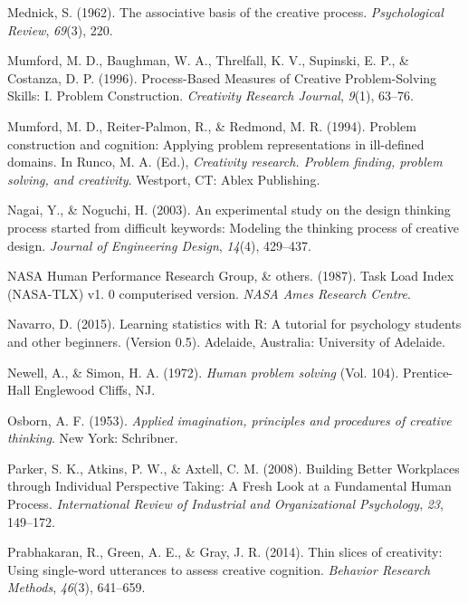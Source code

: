 \documentclass[english,man]{apa6}
\begin{document}
\leavevmode\hypertarget{ref-mednick1962associative}{}%
Mednick, S. (1962). The associative basis of the creative process.
\emph{Psychological Review}, \emph{69}(3), 220.

\leavevmode\hypertarget{ref-mumford_process-based_1996}{}%
Mumford, M. D., Baughman, W. A., Threlfall, K. V., Supinski, E. P., \&
Costanza, D. P. (1996). Process-Based Measures of Creative
Problem-Solving Skills: I. Problem Construction. \emph{Creativity
Research Journal}, \emph{9}(1), 63--76.

\leavevmode\hypertarget{ref-mumford_problem_1994}{}%
Mumford, M. D., Reiter-Palmon, R., \& Redmond, M. R. (1994). Problem
construction and cognition: Applying problem representations in
ill-defined domains. In Runco, M. A. (Ed.), \emph{Creativity research.
Problem finding, problem solving, and creativity}. Westport, CT: Ablex
Publishing.

\leavevmode\hypertarget{ref-nagai2003experimental}{}%
Nagai, Y., \& Noguchi, H. (2003). An experimental study on the design
thinking process started from difficult keywords: Modeling the thinking
process of creative design. \emph{Journal of Engineering Design},
\emph{14}(4), 429--437.

\leavevmode\hypertarget{ref-nasa1987task}{}%
NASA Human Performance Research Group, \& others. (1987). Task Load
Index (NASA-TLX) v1. 0 computerised version. \emph{NASA Ames Research
Centre}.

\leavevmode\hypertarget{ref-NavarroLearningstatisticstutorial2015}{}%
Navarro, D. (2015). Learning statistics with R: A tutorial for
psychology students and other beginners. (Version 0.5). Adelaide,
Australia: University of Adelaide.

\leavevmode\hypertarget{ref-newell1972human}{}%
Newell, A., \& Simon, H. A. (1972). \emph{Human problem solving} (Vol.
104). Prentice-Hall Englewood Cliffs, NJ.

\leavevmode\hypertarget{ref-osborn1953applied}{}%
Osborn, A. F. (1953). \emph{Applied imagination, principles and
procedures of creative thinking}. New York: Schribner.

\leavevmode\hypertarget{ref-parker20085}{}%
Parker, S. K., Atkins, P. W., \& Axtell, C. M. (2008). Building Better
Workplaces through Individual Perspective Taking: A Fresh Look at a
Fundamental Human Process. \emph{International Review of Industrial and
Organizational Psychology}, \emph{23}, 149--172.

\leavevmode\hypertarget{ref-prabhakaran2014thin}{}%
Prabhakaran, R., Green, A. E., \& Gray, J. R. (2014). Thin slices of
creativity: Using single-word utterances to assess creative cognition.
\emph{Behavior Research Methods}, \emph{46}(3), 641--659.
\end{document}
